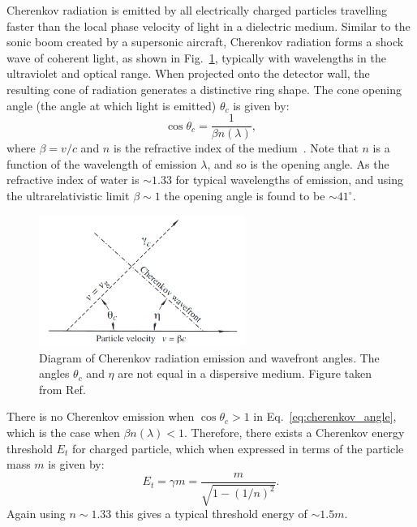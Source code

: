Cherenkov radiation is emitted by all electrically charged particles travelling faster than the
local phase velocity of light in a dielectric medium. Similar to the sonic boom created by a
supersonic aircraft, Cherenkov radiation forms a shock wave of coherent light, as shown in
Fig.~\ref{fig:cherenkov}, typically with wavelengths in the ultraviolet and optical range. When
projected onto the detector wall, the resulting cone of radiation generates a distinctive ring
shape. The cone opening angle (the angle at which light is emitted) $\theta_{c}$ is given by:
\begin{equation}
    \cos\theta_{c} = \frac{1}{\beta n(\lambda)},
    \label{eq:cherenkov_angle}
\end{equation}
where $\beta=v/c$ and $n$ is the refractive index of the medium~\cite{particle2020}. Note that $n$
is a function of the wavelength of emission $\lambda$, and so is the opening angle. As the
refractive index of water is $\sim 1.33$ for typical wavelengths of emission, and using the
ultrarelativistic limit $\beta\sim 1$ the opening angle is found to be $\sim41^{\circ}$.

\begin{figure} %
    \includegraphics[width=0.6\textwidth]{diagrams/4-chips/cherenkov.png}
    \caption[Diagram of Cherenkov radiation emission.]
    {Diagram of Cherenkov radiation emission and wavefront angles. The angles $\theta_{c}$ and
        $\eta$ are not equal in a dispersive medium. Figure taken from Ref.~\cite{particle2020}}
    \label{fig:cherenkov}
\end{figure}

There is no Cherenkov emission when $\cos\theta_{c} > 1$ in Eq.~\ref{eq:cherenkov_angle}, which is
the case when $\beta n(\lambda)<1$. Therefore, there exists a Cherenkov energy threshold $E_{t}$
for charged particle, which when expressed in terms of the particle mass $m$ is given by:
\begin{equation}
    E_{t} = \gamma m = \frac{m}{\sqrt{1-(1/n)^{2}}}.
    \label{eq:cherenkov_threshold}
\end{equation}
Again using $n\sim 1.33$ this gives a typical threshold energy of $\sim1.5m$.

